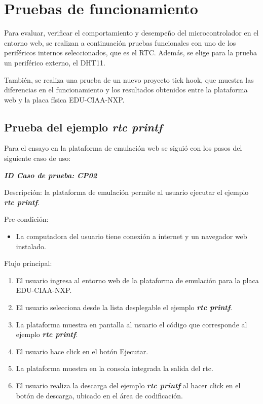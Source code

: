 \section{Pruebas de funcionamiento}  
\label{sec:Pruebas de funcionamiento}

Para evaluar, verificar el comportamiento y desempeño del microcontrolador en el entorno web, se realizan a continuación pruebas funcionales con uno de los periféricos internos seleccionados, que es el RTC. Además, se elige para la prueba un periférico externo, el DHT11.

También, se realiza una prueba de un nuevo proyecto \textquotedbl tick hook\textquotedbl, que muestra las diferencias en el funcionamiento y los resultados obtenidos entre la plataforma web y la placa física EDU-CIAA-NXP.

\subsection{ Prueba del ejemplo \textit{\textbf{rtc printf}}}

Para el ensayo en la plataforma de emulación web se siguió con los pasos del siguiente caso de uso:

\textit{\textbf{ID Caso de prueba: CP02}}

Descripción: la plataforma de emulación permite al usuario ejecutar el ejemplo \textit{\textbf{rtc printf}}.

Pre-condición: 
\begin{itemize}
	\item La computadora del usuario tiene conexión a internet y un navegador web instalado.
\end{itemize}

Flujo principal:
\begin{enumerate}
	\item El usuario ingresa al entorno web de la plataforma de emulación para la placa EDU-CIAA-NXP.
	\item El usuario selecciona desde la lista desplegable el ejemplo \textit{\textbf{rtc printf}}.
	\item La plataforma muestra en pantalla al usuario el código que corresponde al ejemplo \textit{\textbf{rtc printf}}.
	\item El usuario hace click en el botón \textquotedbl Ejecutar\textquotedbl.
	\item La plataforma muestra en la consola integrada la salida del rtc.
	\item El usuario realiza la descarga del ejemplo \textit{\textbf{rtc printf}} al hacer click en el botón de descarga, ubicado en el área de codificación.

\end{enumerate}


